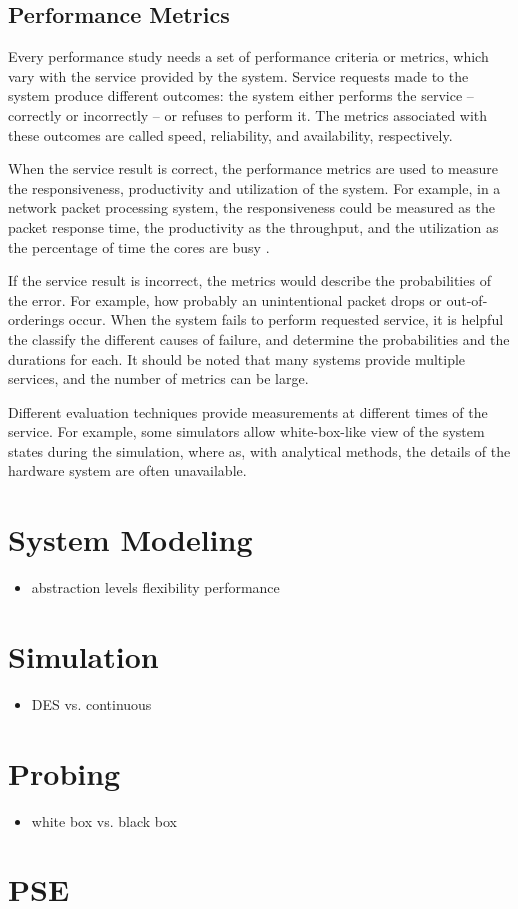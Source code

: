 \subsection{Performance Metrics}
Every performance study needs a set of performance criteria or metrics, which vary with the service provided by the system. Service requests made to the system produce different outcomes: the system either performs the service -- correctly or incorrectly -- or refuses to perform it. The metrics associated with these outcomes are called speed, reliability, and availability, respectively. \cite{jain:1991:AOCSPA}

When the service result is correct, the performance metrics are used to measure the responsiveness, productivity and utilization of the system. For example, in a network packet processing system, the responsiveness could be measured as the packet response time, the productivity as the throughput, and the utilization as the percentage of time the cores are busy \cite{Cavium FUNDAMENTALS}. \cite{jain:1991:AOCSPA}

If the service result is incorrect, the metrics would describe the probabilities of the error. For example, how probably an unintentional packet drops or out-of-orderings occur. When the system fails to perform requested service, it is helpful the classify the different causes of failure, and determine the probabilities and the durations for each. It should be noted that many systems provide multiple services, and the number of metrics can be large. \cite{jain:1991:AOCSPA}

Different evaluation techniques provide measurements at different times of the service. For example, some simulators allow white-box-like view of the system states during the simulation, where as, with analytical methods, the details of the hardware system are often unavailable. \cite{jain:1991:AOCSPA}

\section{System Modeling}
\begin{itemize}
\item abstraction levels
\subitem flexibility
\subitem performance
\end{itemize}

\section{Simulation}
\begin{itemize}
\item DES vs. continuous
\end{itemize}

\section{Probing}
\begin{itemize}
\item white box vs. black box
\end{itemize}

\section{PSE}


